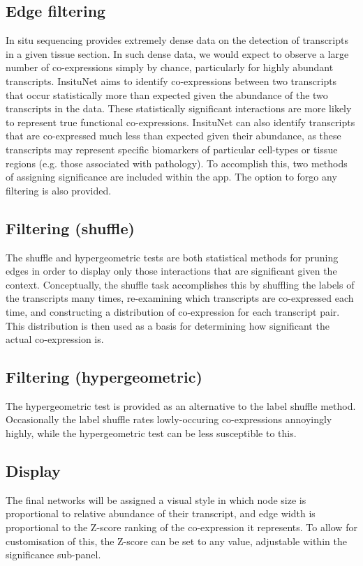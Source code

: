 \documentclass[a4paper,12pt]{article}
\begin{document}
\subsection{Edge filtering} \label{filtering}

In situ sequencing provides extremely dense data on the detection of transcripts in a given tissue section. In such dense data, we would expect to observe a large number of co-expressions simply by chance, particularly for highly abundant transcripts. InsituNet aims to identify co-expressions between two transcripts that occur statistically more than expected given the abundance of the two transcripts in the data. These statistically significant interactions are more likely to represent true functional co-expressions. InsituNet can also identify transcripts that are co-expressed much less than expected given their abundance, as these transcripts may represent specific biomarkers of particular cell-types or tissue regions (e.g. those associated with pathology). To accomplish this, two methods of assigning significance are included within the app. The option to forgo any filtering is also provided.


\subsection{Filtering (shuffle)}
The shuffle and hypergeometric tests are both statistical methods for pruning edges in order to display only those interactions that are significant given the context. Conceptually, the shuffle task accomplishes this by shuffling the labels of the transcripts many times, re-examining which transcripts are co-expressed each time, and constructing a distribution of co-expression for each transcript pair. This distribution is then used as a basis for determining how significant the actual co-expression is.

\subsection{Filtering (hypergeometric)}
The hypergeometric test is provided as an alternative to the label shuffle method. Occasionally the label shuffle rates lowly-occuring co-expressions annoyingly highly, while the hypergeometric test can be less susceptible to this.

\subsection{Display}
The final networks will be assigned a visual style in which node size is proportional to relative abundance of their transcript, and edge width is proportional to the Z-score ranking of the co-expression it represents. To allow for customisation of this, the Z-score can be set to any value, adjustable within the significance sub-panel.
\end{document}
